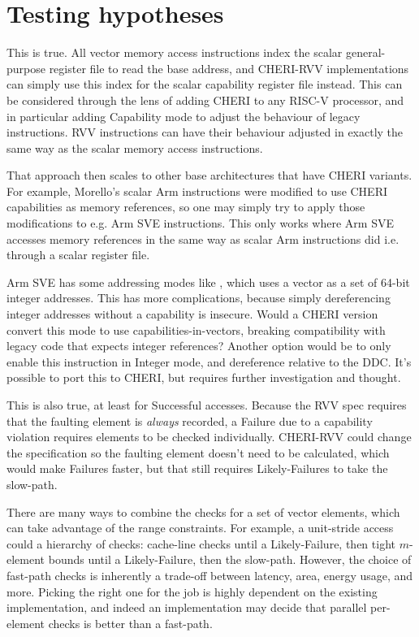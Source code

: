 \section{Testing hypotheses}

This is true.
All vector memory access instructions index the scalar general-purpose register file to read the base address, and CHERI-RVV implementations can simply use this index for the scalar capability register file instead.
This can be considered through the lens of adding CHERI to any RISC-V processor, and in particular adding Capability mode to adjust the behaviour of legacy instructions.
RVV instructions can have their behaviour adjusted in exactly the same way as the scalar memory access instructions.

That approach then scales to other base architectures that have CHERI variants.
For example, Morello's scalar Arm instructions were modified to use CHERI capabilities as memory references\cite[Section 1.3]{armltdMorelloArchitectureReference2021}, so one may simply try to apply those modifications to e.g. Arm SVE instructions.
This only works where Arm SVE accesses memory references in the same way as scalar Arm instructions did i.e. through a scalar register file.

Arm SVE has some addressing modes like , which uses a vector as a set of 64-bit integer addresses\cite{armltdArmCompilerScalable2019}.
This has more complications, because simply dereferencing integer addresses without a capability is insecure.
Would a CHERI version convert this mode to use capabilities-in-vectors, breaking compatibility with legacy code that expects integer references?
Another option would be to only enable this instruction in Integer mode, and dereference relative to the DDC.
It's possible to port this to CHERI, but requires further investigation and thought.

This is also true, at least for Successful accesses.
Because the RVV spec requires that the faulting element is \emph{always} recorded\cite[Section 17]{specification-RVV-v1.0}, a Failure due to a capability violation requires elements to be checked individually.
CHERI-RVV could change the specification so the faulting element doesn't need to be calculated, which would make Failures faster, but that still requires Likely-Failures to take the slow-path.

There are many ways to combine the checks for a set of vector elements, which can take advantage of the range constraints.
For example, a unit-stride access could a hierarchy of checks: cache-line checks until a Likely-Failure, then tight $m$-element bounds until a Likely-Failure, then the slow-path.
However, the choice of fast-path checks is inherently a trade-off between latency, area, energy usage, and more.
Picking the right one for the job is highly dependent on the existing implementation, and indeed an implementation may decide that parallel per-element checks is better than a fast-path.
